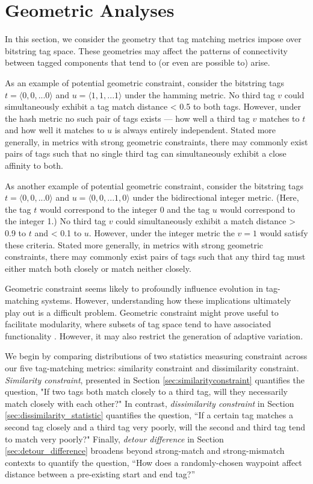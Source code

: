 \section{Geometric Analyses} \label{sec:geometric}

In this section, we consider the geometry that tag matching metrics impose over bitstring tag space.
These geometries may affect the patterns of connectivity between tagged components that tend to (or even are possible to) arise.

As an example of potential geometric constraint, consider the bitstring tags $t = \langle 0, 0, ... 0 \rangle$ and $u = \langle 1, 1, ... 1 \rangle$ under the hamming metric.
No third tag $v$ could simultaneously exhibit a tag match distance < 0.5 to both tags.
However, under the hash metric no such pair of tags exists --- how well a third tag $v$ matches to $t$ and how well it matches to $u$ is always entirely independent.
Stated more generally, in metrics with strong geometric constraints, there may commonly exist pairs of tags such that no single third tag can simultaneously exhibit a close affinity to both.

As another example of potential geometric constraint, consider the bitstring tags $t = \langle 0, 0, ... 0 \rangle$ and $u = \langle 0, 0, ... 1 , 0 \rangle$ under the bidirectional integer metric.
(Here, the tag $t$ would correspond to the integer 0 and the tag $u$ would correspond to the integer 1.)
No third tag $v$ could simultaneously exhibit a match distance > 0.9 to $t$ and < 0.1 to $u$.
However, under the integer metric the $v = 1$ would satisfy these criteria.
Stated more generally, in metrics with strong geometric constraints, there may commonly exist pairs of tags such that any third tag must either match both closely or match neither closely.

Geometric constraint seems likely to profoundly influence evolution in tag-matching systems.
However, understanding how these implications ultimately play out is a difficult problem.
Geometric constraint might prove useful to facilitate modularity, where subsets of tag space tend to have associated functionality \citep{holland1990concerning}.
However, it may also restrict the generation of adaptive variation.

We begin by comparing distributions of two statistics measuring constraint across our five tag-matching metrics: similarity constraint and dissimilarity constraint.
\textit{Similarity constraint}, presented in Section \ref{sec:similarityconstraint} quantifies the question, "If two tags both match closely to a third tag, will they necessarily match closely with each other?"
In contrast, \textit{dissimilarity constraint} in Section \ref{sec:dissimilarity_statistic} quantifies the question, ``If a certain tag matches a second tag closely and a third tag very poorly, will the second and third tag tend to match very poorly?"
Finally, \textit{detour difference} in Section \ref{sec:detour_difference} broadens beyond strong-match and strong-mismatch contexts to quantify the question, ``How does a randomly-chosen waypoint affect distance between a pre-existing start and end tag?''

